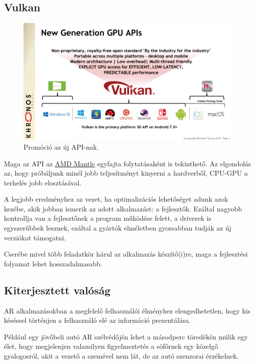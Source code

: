 \subsection{Vulkan}
\begin{figure}[h]
	\includegraphics[width=\textwidth]{img/vulkan/vulkanpromo}
	\centering
	\caption{Prom\'oci\'o az \'uj API-nak.
		\cite{vulkan1.1launchpres} }
\end{figure}
Maga az API az \href{https://www.amd.com/en-us/innovations/software-technologies/mantle}{AMD Mantle} egyfajta folytat\'asak\'ent is tekinthet\H o. Az elgondol\'as az, hogy pr\'ob\'aljunk min\'el jobb teljes\'itm\'enyt kinyerni a hardverb\H ol, CPU-GPU a terhel\'es jobb eloszt\'as\'aval.

A legjobb eredm\'enyhez az vezet, ha optimaliz\'aci\'os lehet\H os\'eget adunk azok kez\'ebe, akik jobban ismerik az adott alkalmaz\'ast: a fejleszt\H ok.
Ez\'altal nagyobb kontrollja van a fejleszt\H onek a program m\H uk\"od\'ese felett, a driverek is egyszer\H ubbek lesznek, ez\'altal a gy\'art\'ok elm\'eletben gyorsabban tudj\'ak az \'uj verzi\'okat t\'amogatni.

Cser\'ebe mivel t\"obb feladatk\"or h\'arul az alkalmaz\'as k\'esz\'it\H o(i)re, maga a fejleszt\'esi folyamat lehet hosszadalmasabb.

\subsection{Kiterjesztett val\'os\'ag}
AR alkalmaz\'asokban a megfelel\H o felhaszn\'al\'oi \'elm\'enyhez elengedhetetlen, hogy kis k\'es\'essel t\"ort\'enjen a felhaszn\'al\'o el\'e az inform\'aci\'o prezent\'al\'asa. 

P\'eld\'aul egy j\"ov\H obeli aut\'o AR sz\'elv\'ed\H oj\'en lehet a m\'asodperc t\"ored\'ek\'en m\'ulik egy \'elet, hogy megjelenjen valamilyen figyelmeztet\'es a s\"of\H ornek egy k\"ozelg\H o gyalogosr\'ol, akit a vezet\H o a szem\'evel nem l\'at, de az aut\'o szenzorai \'erz\'ekelnek.

